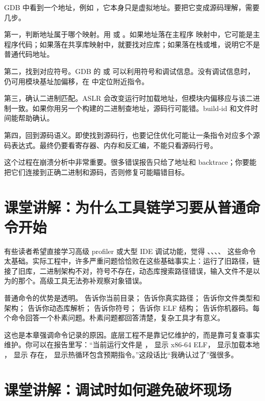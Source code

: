 GDB 中看到一个地址，例如 ，它本身只是虚拟地址。要把它变成源码理解，需要几步。

第一，判断地址属于哪个映射。用  或 。如果地址落在主程序  映射中，它可能是主程序代码；如果落在共享库映射中，就要找对应库；如果落在栈或堆，说明它不是普通代码地址。

第二，找到对应符号。GDB 的  或  可以利用符号和调试信息。没有调试信息时，仍可用模块基址加偏移，在  中定位附近指令。

第三，确认二进制匹配。ASLR 会改变运行时加载地址，但模块内偏移应与该二进制一致。如果你用另一个构建的二进制查地址，源码行可能错。build-id 和文件时间能帮助确认。

第四，回到源码语义。即使找到源码行，也要记住优化可能让一条指令对应多个源码表达式。最终仍要看寄存器、内存和反汇编，不能只看源码行号。

这个过程在崩溃分析中非常重要。很多错误报告只给了地址和 backtrace；你要能把它们连接到正确二进制和源码，否则修复可能瞄错目标。

\section{课堂讲解：为什么工具链学习要从普通命令开始}

有些读者希望直接学习高级 profiler 或大型 IDE 调试功能，觉得 、、、、 这些命令太基础。实际工程中，许多严重问题恰恰败在这些基础事实上：运行了旧路径，链接了旧库，二进制架构不对，符号不存在，动态库搜索路径错误，输入文件不是以为的那个。高级工具无法弥补观察对象错误。

普通命令的优势是透明。  告诉你当前目录； 告诉你真实路径； 告诉你文件类型和架构； 告诉你动态库解析； 告诉你符号； 告诉你 ELF 结构； 告诉你机器码。每个命令回答一个朴素问题。朴素问题都回答清楚，复杂工具才有意义。

这也是本章强调命令记录的原因。底层工程不是靠记忆维护的，而是靠可复查事实维护。你可以在报告里写：“当前运行文件是 ， 显示 x86-64 ELF， 显示加载本地 ， 显示  存在， 显示热循环包含预期指令。”这段话比“我确认过了”强很多。

\section{课堂讲解：调试时如何避免破坏现场}

